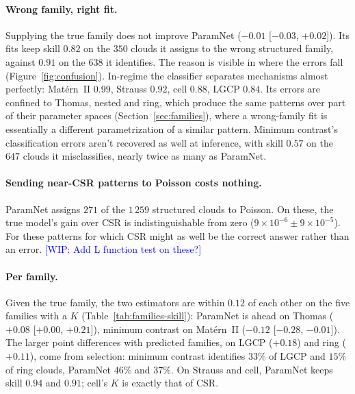 \documentclass[twoside]{article}
\newcommand{\WIP}[1]{\textcolor{blue}{[WIP: #1]}}
\begin{document}
\paragraph{Wrong family, right fit.} Supplying the true family does not improve ParamNet ($-0.01$
[$-0.03$, $+0.02$]). Its fits keep skill $0.82$ on the $350$ clouds it assigns to the wrong structured family, against $0.91$ on
the $638$ it identifies. The reason is visible in where the errors fall (Figure~\ref{fig:confusion}). In-regime the
classifier separates mechanisms almost perfectly: Mat\'ern~II $0.99$, Strauss $0.92$, cell $0.88$, LGCP $0.84$. Its
errors are confined to Thomas, nested and ring, which produce the same patterns over part of their parameter spaces
(Section~\ref{sec:families}), where a wrong-family fit is essentially a different parametrization of a similar pattern. Minimum
contrast's classification errors aren't recovered as well at inference, with skill $0.57$ on the $647$ clouds it misclassifies, nearly twice as many as ParamNet.

\paragraph{Sending near-CSR patterns to Poisson costs nothing.} ParamNet assigns $271$ of the $1\,259$ structured
clouds to Poisson. On these, the true model's gain over CSR is indistinguishable from zero ($9\times10^{-6}\pm9\times10^{-5}$). For these patterns for which CSR might as well be the correct answer rather than an error. \WIP{Add L function test on these?}

\paragraph{Per family.} Given the true family, the two estimators are within $0.12$ of each other on the five families
with a $K$ (Table~\ref{tab:families-skill}): ParamNet is ahead on Thomas ($+0.08$ [$+0.00$, $+0.21$]), minimum
contrast on Mat\'ern~II ($-0.12$ [$-0.28$, $-0.01$]). The larger point differences with predicted families, on LGCP
($+0.18$) and ring ($+0.11$), come from selection: minimum contrast identifies $33\%$ of LGCP and $15\%$ of ring
clouds, ParamNet $46\%$ and $37\%$. On Strauss and cell, ParamNet keeps skill $0.94$ and $0.91$; cell's $K$ is
exactly that of CSR.

\begin{table}[t]
\caption{Skill per family ($180$ clouds each, $179$ for ring), with $95\%$ bootstrap intervals over clouds.
$\Delta$: ParamNet $-$ minimum contrast, given the predicted and the true family; minimum contrast's own skill is
ParamNet's minus $\Delta$. $^\dagger$No closed-form $K$:
minimum contrast never selects these families, and given the true family it uses the training median. Skill can
exceed $1$: on a single replicate, a fit can score better than the true model.}
\label{tab:families-skill}
\begin{center}
\footnotesize
\setlength{\tabcolsep}{3.5pt}

\end{center}
\end{table}
\end{document}
